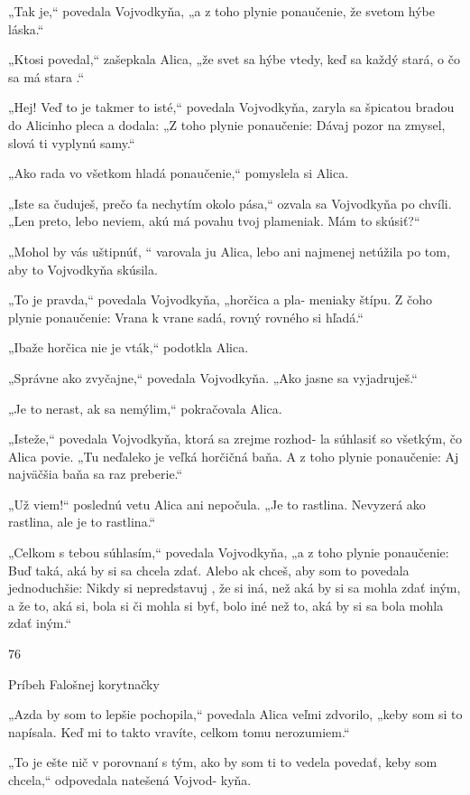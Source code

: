 \documentclass[12pt]{article}
\begin{document}
\begin{Parallel}[p]{}{}
{{„Tak je,“ povedala Vojvodkyňa, „a z toho plynie
ponaučenie, že svetom hýbe láska.“

„Ktosi povedal,“ zašepkala Alica, „že svet sa hýbe vtedy,
keď sa každý stará, o čo sa má stara .“

„Hej! Veď to je takmer to isté,“ povedala Vojvodkyňa,
zaryla sa špicatou bradou do Alicinho pleca a dodala:
„Z toho plynie ponaučenie: Dávaj pozor na zmysel, slová
ti vyplynú samy.“

„Ako rada vo všetkom hladá ponaučenie,“ pomyslela si
Alica.

„Iste sa čuduješ, prečo ťa nechytím okolo pása,“ ozvala sa
Vojvodkyňa po chvíli. „Len preto, lebo neviem, akú má
povahu tvoj plameniak. Mám to skúsiť?“

„Mohol by vás uštipnúť, “ varovala ju Alica, lebo ani
najmenej netúžila po tom, aby to Vojvodkyňa skúsila.

„To je pravda,“ povedala Vojvodkyňa, „horčica a pla-
meniaky štípu. Z čoho plynie ponaučenie: Vrana k vrane
sadá, rovný rovného si hľadá.“

„Ibaže horčica nie je vták,“ podotkla Alica.

„Správne ako zvyčajne,“ povedala Vojvodkyňa. „Ako
jasne sa vyjadruješ.“

„Je to nerast, ak sa nemýlim,“ pokračovala Alica.

„Isteže,“ povedala Vojvodkyňa, ktorá sa zrejme rozhod-
la súhlasiť so všetkým, čo Alica povie. „Tu neďaleko je veľká
horčičná baňa. A z toho plynie ponaučenie: Aj najväčšia
baňa sa raz preberie.“

„Už viem!“ poslednú vetu Alica ani nepočula. „Je to
rastlina. Nevyzerá ako rastlina, ale je to rastlina.“

„Celkom s tebou súhlasím,“ povedala Vojvodkyňa, „a
z toho plynie ponaučenie: Buď taká, aká by si sa chcela
zdať. Alebo ak chceš, aby som to povedala jednoduchšie:
Nikdy si nepredstavuj , že si iná, než aká by si sa mohla zdať
iným, a že to, aká si, bola si či mohla si byť, bolo iné než to,
aká by si sa bola mohla zdať iným.“

76

Príbeh Falošnej korytnačky

„Azda by som to lepšie pochopila,“ povedala Alica veľmi
zdvorilo, „keby som si to napísala. Keď mi to takto vravíte,
celkom tomu nerozumiem.“

„To je ešte nič v porovnaní s tým, ako by som ti to vedela
povedať, keby som chcela,“ odpovedala natešená Vojvod-
kyňa.

}}
\end{Parallel}
\end{document}
